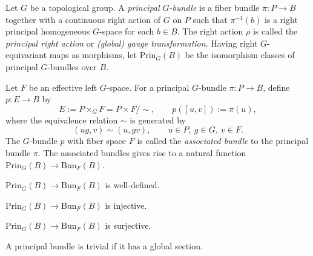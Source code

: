\documentclass{../../large}
\begin{document}
\begin{prb}
Let $G$ be a topological group.
A \emph{principal $G$-bundle} is a fiber bundle $\pi:P\to B$ together with a continuous right action of $G$ on $P$ such that $\pi^{-1}(b)$ is a right principal homogeneous $G$-space for each $b\in B$.
The right action $\rho$ is called the \emph{principal right action} or \emph{(global) gauge transformation}.
Having right $G$-equivariant maps as morphisms, let $\mathrm{Prin}_G(B)$ be the isomorphism classes of principal $G$-bundles over $B$.

Let $F$ be an effective left $G$-space.
For a principal $G$-bundle $\pi:P\to B$, define $p:E\to B$ by
\[E:=P\times_GF=P\times F/\sim,\qquad p([u,v]):=\pi(u),\]
where the equivalence relation $\sim$ is generated by
\[(ug,v)\sim(u,gv),\qquad u\in P,\ g\in G,\ v\in F.\]
The $G$-bundle $p$ with fiber space $F$ is called the \emph{associated bundle} to the principal bundle $\pi$.
The associated bundles gives rise to a natural function $\mathrm{Prin}_G(B)\to\mathrm{Bun}_F(B)$.
\begin{parts}
\item $\mathrm{Prin}_G(B)\to\mathrm{Bun}_F(B)$ is well-defined.
\item $\mathrm{Prin}_G(B)\to\mathrm{Bun}_F(B)$ is injective.
\item $\mathrm{Prin}_G(B)\to\mathrm{Bun}_F(B)$ is surjective.
\item A principal bundle is trivial if it has a global section.
\end{parts}
\end{prb}
\end{document}
